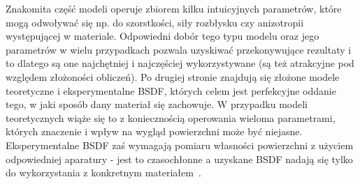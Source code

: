 Znakomita część modeli operuje zbiorem kilku intuicyjnych parametrów, które mogą odwoływać się np. do szorstkości, siły rozbłysku czy anizotropii występującej w materiale. Odpowiedni dobór tego typu modelu oraz jego parametrów w wielu przypadkach pozwala uzyskiwać przekonywujące rezultaty i to dlatego są one najchętniej i najczęściej wykorzystywane (są też atrakcyjne pod względem złożoności obliczeń). Po drugiej stronie znajdują się złożone modele teoretyczne i eksperymentalne BSDF, których celem jest perfekcyjne oddanie tego, w jaki sposób dany materiał się zachowuje. W przypadku modeli teoretycznych wiąże się to z koniecznością operowania wieloma parametrami, których znaczenie i wpływ na wygląd powierzchni może być niejasne. Eksperymentalne BSDF zaś wymagają pomiaru własności powierzchni z użyciem odpowiedniej aparatury - jest to czasochłonne a uzyskane BSDF nadają się tylko do wykorzystania z konkretnym materiałem~\cite{Montes12anoverview}.

